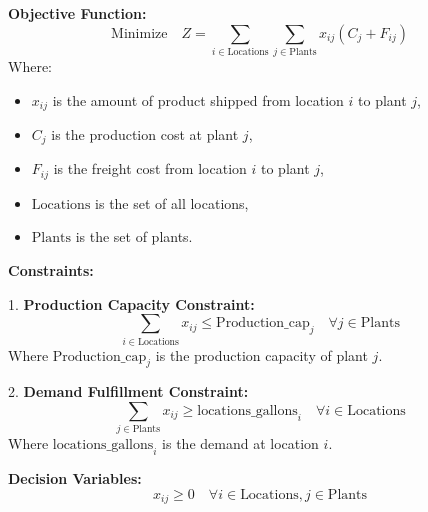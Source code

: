\documentclass{article}
\begin{document}
\textbf{Objective Function:}
\[
\text{Minimize} \quad Z = \sum_{i \in \text{Locations}} \sum_{j \in \text{Plants}} x_{ij} \left( C_j + F_{ij} \right)
\]
Where:
\begin{itemize}
    \item \( x_{ij} \) is the amount of product shipped from location \( i \) to plant \( j \),
    \item \( C_j \) is the production cost at plant \( j \),
    \item \( F_{ij} \) is the freight cost from location \( i \) to plant \( j \),
    \item \( \text{Locations} \) is the set of all locations,
    \item \( \text{Plants} \) is the set of plants.
\end{itemize}

\bigskip

\textbf{Constraints:}

\bigskip

1. \textbf{Production Capacity Constraint:}
\[
\sum_{i \in \text{Locations}} x_{ij} \leq \text{Production\_cap}_j \quad \forall j \in \text{Plants}
\]
Where \( \text{Production\_cap}_j \) is the production capacity of plant \( j \).

\bigskip

2. \textbf{Demand Fulfillment Constraint:}
\[
\sum_{j \in \text{Plants}} x_{ij} \geq \text{locations\_gallons}_i \quad \forall i \in \text{Locations}
\]
Where \( \text{locations\_gallons}_i \) is the demand at location \( i \).

\bigskip

\textbf{Decision Variables:}
\[
x_{ij} \geq 0 \quad \forall i \in \text{Locations}, j \in \text{Plants}
\]
\end{document}
